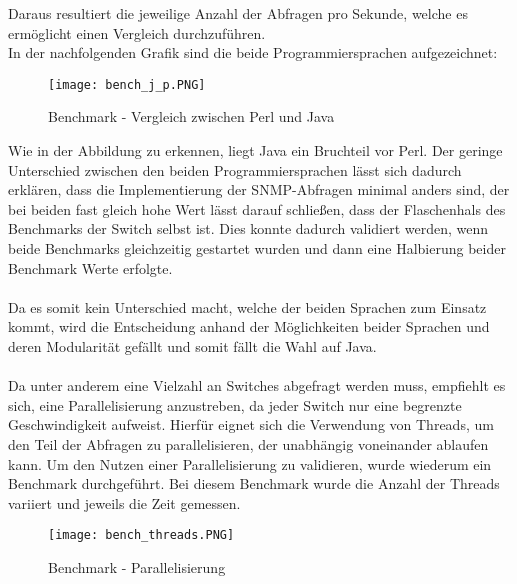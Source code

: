 Daraus resultiert die jeweilige Anzahl der Abfragen pro Sekunde, welche es ermöglicht einen Vergleich durchzuführen.\\

In der nachfolgenden Grafik sind die beide Programmiersprachen aufgezeichnet:\\

\begin{figure}[H]
\centering
\texttt{[image: bench\_j\_p.PNG]}
\caption{Benchmark - Vergleich zwischen Perl und Java}
\label{fig:benchperljava}
\end{figure}

Wie in der Abbildung zu erkennen, liegt Java ein Bruchteil vor Perl.
Der geringe Unterschied zwischen den beiden Programmiersprachen lässt sich dadurch erklären, dass die Implementierung der SNMP-Abfragen minimal anders sind, der bei beiden fast gleich hohe Wert lässt darauf schließen, dass der Flaschenhals des Benchmarks der Switch selbst ist. Dies konnte dadurch validiert werden, wenn beide Benchmarks  gleichzeitig gestartet wurden und dann eine Halbierung beider Benchmark Werte erfolgte.\\\\
Da es somit kein Unterschied macht, welche der beiden Sprachen zum Einsatz kommt, wird die Entscheidung anhand der Möglichkeiten beider Sprachen und deren Modularität gefällt und somit fällt die Wahl auf Java.\\\\
Da unter anderem eine Vielzahl an Switches abgefragt werden muss, empfiehlt es sich, eine Parallelisierung anzustreben, da jeder Switch nur eine begrenzte Geschwindigkeit aufweist.
Hierfür eignet sich die Verwendung von Threads, um den Teil der Abfragen zu parallelisieren, der unabhängig voneinander ablaufen kann.
Um den Nutzen einer Parallelisierung zu validieren, wurde wiederum ein Benchmark durchgeführt. Bei diesem Benchmark wurde die Anzahl der Threads variiert und jeweils die Zeit gemessen.\\

\begin{figure}[H]
\centering
\texttt{[image: bench\_threads.PNG]}
\caption{Benchmark - Parallelisierung}
\label{fig:benchparallel}
\end{figure}

